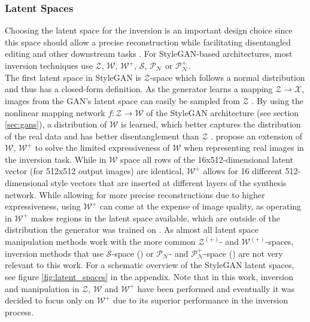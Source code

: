 \subsubsection{Latent Spaces}
Choosing the latent space for the inversion is an important design choice since this space should allow a precise reconstruction while facilitating disentangled editing and other downstream tasks \citep[p.5]{xia2022gan}. For StyleGAN-based architectures, most inversion techniques use $\mathcal{Z}$, $\mathcal{W}$, $\mathcal{W^+}$, $\mathcal{S}$, $\mathcal{P_N}$ or $\mathcal{P_N^+}$. \\
The first latent space in StyleGAN is $\mathcal{Z}$-space which follows a normal distribution and thus has a closed-form definition. As the generator learns a mapping $\mathcal{Z} \rightarrow \mathcal{X}$, images from the GAN's latent space can easily be sampled from $\mathcal{Z}$ \citep[p.5]{bermano2022state}. By using the nonlinear mapping network $f: \mathcal{Z} \rightarrow \mathcal{W}$ of the StyleGAN architecture (see section \ref{sec:gans}), a distribution of $\mathcal{W}$ is learned, which better captures the distribution of the real data \citep[p.6]{stylegan1} and has better disentanglement than $\mathcal{Z}$ \citep[p.7]{shen2020interpreting}. \cite{abdal2019image2stylegan} propose an extension of $\mathcal{W}$, $\mathcal{W^+}$ to solve the limited expressiveness of $\mathcal{W}$ when representing real images in the inversion task. While in $\mathcal{W}$ space all rows of the 16x512-dimensional latent vector (for 512x512 output images) are identical, $\mathcal{W^+}$ allows for 16 different 512-dimensional style vectors that are inserted at different layers of the synthesis network. While allowing for more precise reconstructions due to higher expressiveness, using $\mathcal{W^+}$ can come at the expense of image quality, as operating in $\mathcal{W^+}$ makes regions in the latent space available, which are outside of the distribution the generator was trained on \citep[p.5]{bermano2022state}. As almost all latent space manipulation methods work with the more common $\mathcal{Z^{(+)}}$- and $\mathcal{W^{(+)}}$-spaces, inversion methods that use $\mathcal{S}$-space (\cite{wu2021stylespace}) or $\mathcal{P_N}$- and $\mathcal{P_N^+}$-space (\cite{zhu2020improved}) are not very relevant to this work. For a schematic overview of the StyleGAN latent spaces, see figure \ref{fig:latent_spaces} in the appendix. Note that in this work, inversion and manipulation in $\mathcal{Z}$, $\mathcal{W}$ and $\mathcal{W^+}$ have been performed and eventually it was decided to focus only on $\mathcal{W^+}$ due to its superior performance in the inversion process.


